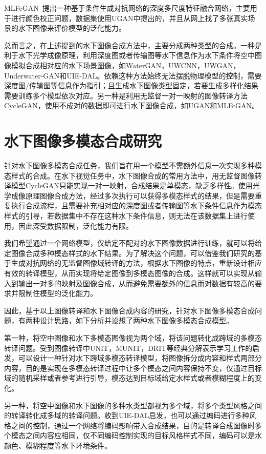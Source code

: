 MLFcGAN~\cite{liu2019mlfcgan}提出一种基于条件生成对抗网络的深度多尺度特征融合网络，主要用于进行颜色校正问题，数据集使用UGAN中提出的，并且从网上找了多张真实场景的水下图像来评价模型的泛化能力。

总而言之，在上述提到的水下图像合成方法中，主要分成两种类型的合成。一种是利于水下光学成像原理，利用深度图或者传输图等水下信息作为水下条件将空中图像模拟合成相对应的水下场景图像，如WaterGAN，UWCNN，UWGAN，Underwater-GAN和UIE-DAL。依赖这种方法始终无法摆脱物理模型的控制，需要深度图/传输图等信息作为指引；且生成水下图像类型固定，若要生成多样化结果需要训练多个模型依次对应。另一种是利用无监督一对一映射的图像转译方法CycleGAN，使用不成对的数据即可进行水下图像合成，如UGAN和MLFcGAN。

\section{水下图像多模态合成研究}
针对水下图像多模态合成任务，我们旨在用一个模型不需额外信息一次实现多种模态样式的合成。在水下视觉任务中，水下图像合成的常用方法中，用无监督图像转译模型CycleGAN只能实现一对一映射，合成结果是单模态，缺乏多样性。使用光学成像原理图像合成方法，经过多次执行可以获得多模态样式的结果，但是需要重复执行合成流程，且需要补充相对应的深度图或者传输图等水下条件信息作为模态样式的引导，若数据集中不存在这种水下条件信息，则无法在该数据集上进行使用，因此深受数据限制，泛化能力有限。

我们希望通过一个网络模型，仅给定不配对的水下图像数据进行训练，就可以将给定图像合成多种模态样式的水下结果。为了解决这个问题，可以借鉴我们研究的基于生成对抗网络的无监督图像域转译的方法，根据水下图像的特点，重新设计相应有效的转译模型，从而实现将给定图像到多模态图像的合成。这样就可以实现从输入到输出一对多的映射及图像合成，从而避免需要额外的信息而对数据有较高的要求并限制住模型的泛化能力。

因此，基于以上图像转译和水下图像合成内容的研究，针对水下图像多模态合成问题，有两种设计思路，如下分析并设想了两种水下图像多模态合成模型。

第一种，将空中图像和水下多模态图像视为两个域，将该问题转化成跨域的多模态转译问题。受到图像转译中UNIT，MUNIT，DRIT等经典分解表示学习工作的启发，可以设计一种针对水下跨域多模态转译模型，将图像拆分成内容和样式两部分内容，目的是实现在多模态转译过程中让多个模态之间内容保持不变，仅通过目标域的随机采样或者参考进行引导，模态达到目标域给定水样式或者模糊程度上的变化。

另一种，将空中图像和水下图像的多种水类型都视为多个域，将多个类型风格之间的转译转化成多域的转译问题。收到UIE-DAL启发，也可以通过编码进行多种风格之间的控制，通过一个网络将编码影响带入合成结果，目的是转译合成图像时多个模态之间内容应相同，仅不同编码控制实现的目标风格样式不同，编码可以是水颜色、模糊程度等水下环境条件。


